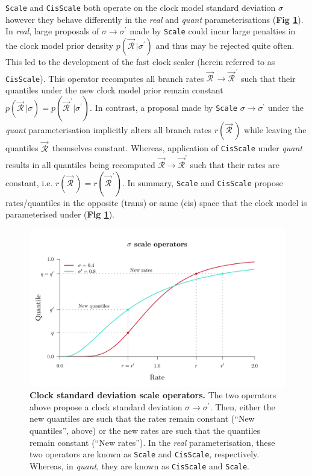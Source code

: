 \documentclass[10pt,letterpaper]{article}
\begin{document}
 \texttt{Scale} and \texttt{CisScale} both operate on the clock model standard deviation $\sigma$ however they behave differently in the \textit{real} and \textit{quant} parameterisations (\textbf{Fig \ref{fig:clockSDoperators}}).
In \textit{real}, large proposals of $\sigma \rightarrow \sigma^\prime$ made by  \texttt{Scale} could incur large penalties in the clock model prior density $p(\vec{\mathcal{R}}^{\,}|\sigma^\prime)$ and thus may be rejected quite often. 
This led to the development of the fast clock scaler \cite{zhang2020improving} (herein referred to as \texttt{CisScale}).
This operator recomputes all branch rates $\vec{\mathcal{R}}^{\,} \rightarrow \vec{\mathcal{R}}^{\, \prime}$ such that their quantiles under the new clock model prior remain constant $p(\vec{\mathcal{R}}^{\,}|\sigma) = p(\vec{\mathcal{R}}^{\, \prime}|\sigma^\prime)$.
In contrast, a proposal made by \texttt{Scale} $\sigma \rightarrow \sigma^\prime$ under the \textit{quant} parameterisation implicitly alters all branch rates $r(\vec{\mathcal{R}}^{\,})$ while leaving the quantiles $\vec{\mathcal{R}}^{\,}$ themselves constant.
Whereas, application of \texttt{CisScale} under \textit{quant} results in all quantiles being recomputed $\vec{\mathcal{R}} \rightarrow \vec{\mathcal{R}}^\prime$  such that their rates are constant, i.e. $r(\vec{\mathcal{R}}^{\,}) = r(\vec{\mathcal{R}}^{\,\prime})$.
In summary, \texttt{Scale} and \texttt{CisScale} propose rates/quantiles in the opposite (trans) or same (cis) space that the clock model is parameterised under (\textbf{Fig \ref{fig:clockSDoperators}}).




\begin{figure}[!h]
\centering
\includegraphics[width=\textwidth]{Figures/clockSD.pdf}
\caption{\textbf{Clock standard deviation scale operators.}
The two operators above propose a clock standard deviation $\sigma \rightarrow \sigma^\prime$. 
Then, either the new quantiles are such that the rates remain constant (``New quantiles'', above) or the new rates are  such that the quantiles remain constant (``New rates''). 
In the \textit{real} parameterisation, these two operators are known as \texttt{Scale} and \texttt{CisScale}, respectively.
Whereas, in \textit{quant}, they are known as \texttt{CisScale} and \texttt{Scale}.    }
\label{fig:clockSDoperators}
\end{figure}
\end{document}
